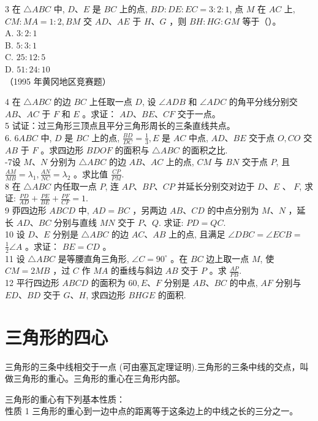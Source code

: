 \documentclass[10pt]{article}
\begin{document}
3 在 $\triangle A B C$ 中, $D 、 E$ 是 $B C$ 上的点, $B D: D E: E C=3: 2: 1$, 点 $M$ 在 $A C$ 上, $C M: M A=1: 2, B M$ 交 $A D 、 A E$ 于 $H 、 G$ ，则 $B H: H G: G M$ 等于（）。\\
A. $3: 2: 1$\\
B. $5: 3: 1$\\
C. $25: 12: 5$\\
D. $51: 24: 10$\\
（1995 年黄冈地区竞赛题）

4 在 $\triangle A B C$ 的边 $B C$ 上任取一点 $D$, 设 $\angle A D B$ 和 $\angle A D C$ 的角平分线分别交 $A B 、 A C$ 于 $F$ 和 $E$ 。求证： $A D 、 B E 、 C F$ 交于一点。\\
5 试证：过三角形三顶点且平分三角形周长的三条直线共点。\\
6. $6 A B C$ 中, $D$ 是 $B C$ 上的点, $\frac{B D}{D C}=\frac{1}{3}, E$ 是 $A C$ 中点, $A D 、 B E$ 交于点 $O, C O$ 交 $A B$ 于 $F$ 。求四边形 $B D O F$ 的面积与 $\triangle A B C$ 的面积之比.\\
-7设 $M 、 N$ 分别为 $\triangle A B C$ 的边 $A B 、 A C$ 上的点, $C M$ 与 $B N$ 交于点 $P$, 且 $\frac{A M}{M B}=\lambda_{1}, \frac{A N}{N C}=\lambda_{2}$ 。求比值 $\frac{C P}{P M}$.\\
8 在 $\triangle A B C$ 内任取一点 $P$, 连 $A P 、 B P 、 C P$ 并延长分别交对边于 $D 、 E$ 、 $F$, 求证: $\frac{P D}{A D}+\frac{P E}{B E}+\frac{P F}{C F}=1$.\\
9 丣四边形 $A B C D$ 中, $A D=B C$ ，另两边 $A B 、 C D$ 的中点分别为 $M 、 N$ ，延长 $A D 、 B C$ 分别与直线 $M N$ 交于 $P 、 Q$. 求证: $P D=Q C$.\\
10 设 $D 、 E$ 分别是 $\triangle A B C$ 的边 $A C 、 A B$ 上的点, 且满足 $\angle D B C=\angle E C B=$ $\frac{1}{2} \angle A$ 。求证： $B E=C D$ 。\\
11 设 $\triangle A B C$ 是等腰直角三角形, $\angle C=90^{\circ}$ 。在 $B C$ 边上取一点 $M$, 使 $C M=2 M B$ ，过 $C$ 作 $M A$ 的垂线与斜边 $A B$ 交于 $P$ 。求 $\frac{A P}{P B}$.\\
12 平行四边形 $A B C D$ 的面积为 $60, E 、 F$ 分别是 $A B 、 B C$ 的中点, $A F$ 分别与 $E D 、 B D$ 交于 $G 、 H$, 求四边形 $B H G E$ 的面积.

\section*{三角形的四心}
三角形的三条中线相交于一点 (可由塞瓦定理证明).三角形的三条中线的交点，叫做三角形的重心。三角形的重心在三角形内部。

三角形的重心有下列基本性质：\\
性质 1 三角形的重心到一边中点的距离等于这条边上的中线之长的三分之一。
\end{document}
